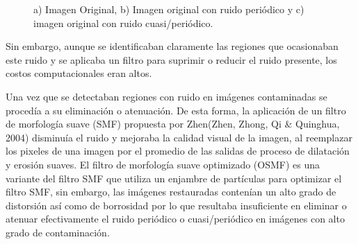 \documentclass[10pt,letterpaper]{article}
\begin{document}
\begin{figure}[H]
      \begin{center}
        \caption{a) Imagen Original, b) Imagen original con ruido periódico y c) imagen original con ruido cuasi/periódico.}
        \label{tif313233}
      \end{center}
    \end{figure}

Sin embargo, aunque se identificaban claramente las regiones que ocasionaban este ruido y se aplicaba un filtro para suprimir o reducir el ruido presente, los costos computacionales eran altos. 

Una vez que se detectaban regiones con ruido en imágenes contaminadas se procedía a su eliminación o atenuación. De esta forma, la aplicación de un filtro de morfología suave (SMF) propuesta por Zhen(Zhen, Zhong, Qi \& Quinghua, 2004)\cite{Zhen:Ming} disminuía el ruido y mejoraba la calidad visual de la imagen, al reemplazar los pixeles de una imagen por el promedio de las salidas de proceso de dilatación y erosión suaves. El filtro de morfología suave optimizado (OSMF) es una variante del filtro SMF que utiliza un enjambre de partículas para optimizar el filtro SMF, sin embargo, las imágenes restauradas contenían un alto grado de distorsión así como de borrosidad por lo que resultaba insuficiente en eliminar o atenuar efectivamente el ruido periódico o cuasi/periódico en imágenes con alto grado de contaminación\cite{Ji:Lu}. %
\end{document}
